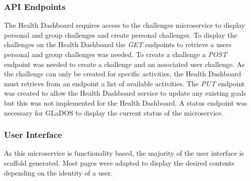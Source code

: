\subsubsection{API Endpoints}
\par
The Health Dashboard requires access to the challenges microservice to display personal and group challenges and create personal challenges. To display the challenges on the Health Dashboard the \textit{GET} endpoints to retrieve a users personal and group challenges was needed. To create a challenge a \textit{POST} endpoint was needed to create a challenge and an associated user challenge. As the challenge can only be created for specific activities, the Health Dashboard must retrieve from an endpoint a list of available activities.
The \textit{PUT} endpoint was created to allow the Health Dashboard service to update any existing goals but this was not implemented for the Health Dashboard.
A status endpoint was necessary for GLaDOS to display the current status of the microservice. 

\subsubsection{User Interface}
\par
As this microservice is functionality based, the majority of the user interface is scaffold generated. Most pages were adapted to display the desired contents depending on the identity of a user.
